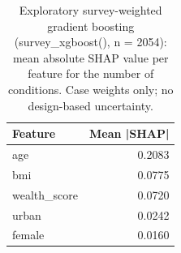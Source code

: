 \begin{table}

\caption{\label{tab:tab_shap_importance}Exploratory survey-weighted gradient boosting (survey\_xgboost(), n = 2054): mean absolute SHAP value per feature for the number of conditions. Case weights only; no design-based uncertainty.}
\centering
\begin{tabular}[t]{lr}
\toprule
Feature & Mean |SHAP|\\
\midrule
age & 0.2083\\
bmi & 0.0775\\
wealth\_score & 0.0720\\
urban & 0.0242\\
female & 0.0160\\
\bottomrule
\end{tabular}
\end{table}

